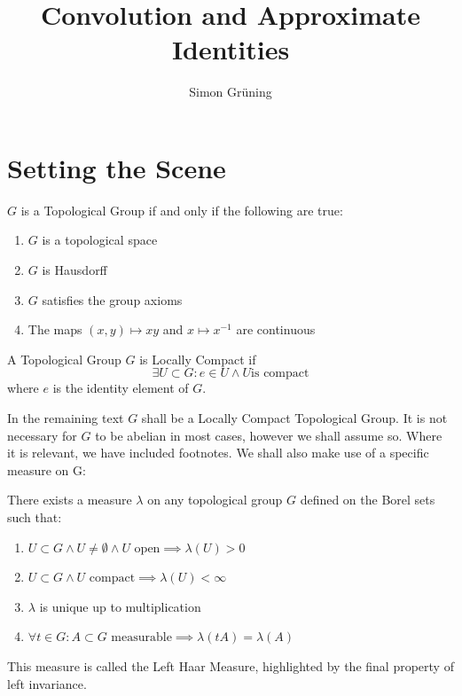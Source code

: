 


\title{Convolution and Approximate Identities}
\author{Simon Gr\"uning}
\address[Simon Gr\"uning]{University of Zurich, R\"{a}mistrasse 71, 8006 Zurich}

\maketitle


\section{Setting the Scene}

\begin{definition}
$G$ is a Topological Group if and only if the following are true:
\begin{enumerate}
\item $G$ is a topological space
\item $G$ is Hausdorff
\item $G$ satisfies the group axioms
\item The maps $ (x,y) \mapsto xy $ and $ x \mapsto x^{-1}$ are continuous
\end{enumerate}
\end{definition}

\begin{definition}
A Topological Group $G$ is Locally Compact if 
\begin{equation*}
\exists U \subset G: e \in U \wedge U \text{is compact}
\end{equation*}
where $e$ is the identity element of $G$.
\end{definition}

In the remaining text $G$ shall be a Locally Compact Topological Group. It is not necessary for $G$ to be abelian in most cases, however we shall assume so. Where it is relevant, we have included footnotes. We shall also make use of a specific measure on G:

\begin{lemma}
There exists a measure $\lambda$ on any topological group $G$ defined on the Borel sets such that:
\begin{enumerate}
\item $U \subset G \wedge U \neq \emptyset \wedge U \text{ open} \implies \lambda(U) > 0$
\item $U \subset G \wedge U \text{ compact} \implies \lambda(U) < \infty$
\item $\lambda$ is unique up to multiplication
\item $\forall t \in G: A \subset G \text{ measurable} \implies \lambda(tA) = \lambda(A)$
\end{enumerate}
This measure is called the Left Haar Measure, highlighted by the final property of left invariance.
\end{lemma}

